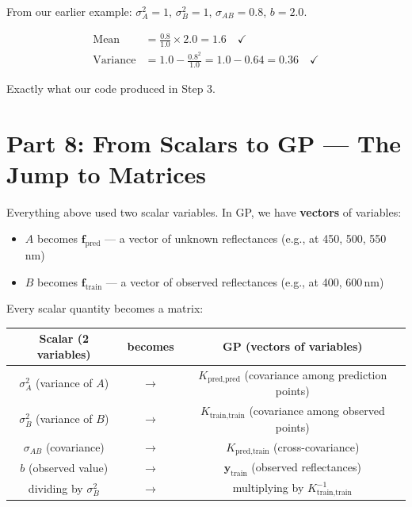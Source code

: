 \documentclass[11pt, a4paper]{article}
\begin{document}
From our earlier example: $\sigma_A^2 = 1$, $\sigma_B^2 = 1$, $\sigma_{AB} = 0.8$, $b = 2.0$.

\begin{align}
\text{Mean} &= \frac{0.8}{1.0} \times 2.0 = 1.6 \quad \checkmark \tag{P19} \\[8pt]
\text{Variance} &= 1.0 - \frac{0.8^2}{1.0} = 1.0 - 0.64 = 0.36 \quad \checkmark \tag{P20}
\end{align}

Exactly what our code produced in Step 3.


\section*{\color{secblue}Part 8: From Scalars to GP --- The Jump to Matrices}

Everything above used two scalar variables. In GP, we have \textbf{vectors} of variables:

\begin{itemize}
\item $A$ becomes $\mathbf{f}_{\text{pred}}$ --- a vector of unknown reflectances (e.g., at 450, 500, 550\,nm)
\item $B$ becomes $\mathbf{f}_{\text{train}}$ --- a vector of observed reflectances (e.g., at 400, 600\,nm)
\end{itemize}

\bigskip
Every scalar quantity becomes a matrix:

\begin{center}
\renewcommand{\arraystretch}{1.4}
\begin{tabular}{ccc}
\toprule
\textbf{Scalar (2 variables)} & \textbf{becomes} & \textbf{GP (vectors of variables)} \\
\midrule
$\sigma_A^2$ (variance of $A$) & $\longrightarrow$ & $K_{\text{pred,pred}}$ (covariance among prediction points) \\
$\sigma_B^2$ (variance of $B$) & $\longrightarrow$ & $K_{\text{train,train}}$ (covariance among observed points) \\
$\sigma_{AB}$ (covariance) & $\longrightarrow$ & $K_{\text{pred,train}}$ (cross-covariance) \\
$b$ (observed value) & $\longrightarrow$ & $\mathbf{y}_{\text{train}}$ (observed reflectances) \\
dividing by $\sigma_B^2$ & $\longrightarrow$ & multiplying by $K_{\text{train,train}}^{-1}$ \\
\bottomrule
\end{tabular}
\end{center}
\end{document}
